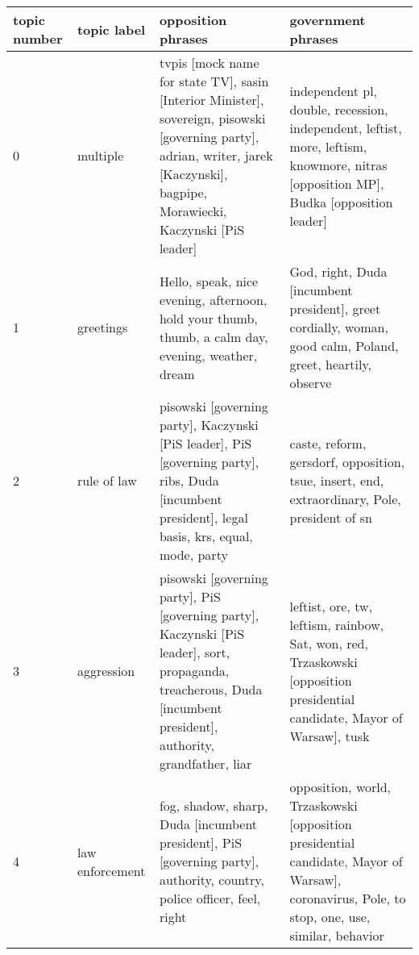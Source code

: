 \begin{tabular}{p{2cm}p{2cm}p{5cm}p{5cm}}
\toprule
topic number &              topic label &                                                                                                                                                                opposition phrases &                                                                                                                                                                               government phrases \\
\midrule
           0 &                 multiple &  tvpis [mock name for state TV], sasin [Interior Minister], sovereign, pisowski [governing party], adrian, writer, jarek [Kaczynski], bagpipe, Morawiecki, Kaczynski [PiS leader] &                                                              independent pl, double, recession, independent, leftist, more, leftism, knowmore, nitras [opposition MP], Budka [opposition leader] \\
           1 &                greetings &                                                                                Hello, speak, nice evening, afternoon, hold your thumb, thumb, a calm day, evening, weather, dream &                                                                                      God, right, Duda [incumbent president], greet cordially, woman, good calm, Poland, greet, heartily, observe \\
           2 &              rule of law &                                 pisowski [governing party], Kaczynski [PiS leader], PiS [governing party], ribs, Duda [incumbent president], legal basis, krs, equal, mode, party &                                                                                                     caste, reform, gersdorf, opposition, tsue, insert, end, extraordinary, Pole, president of sn \\
           3 &               aggression &                pisowski [governing party], PiS [governing party], Kaczynski [PiS leader], sort, propaganda, treacherous, Duda [incumbent president], authority, grandfather, liar &                                                                        leftist, ore, tw, leftism, rainbow, Sat, won, red, Trzaskowski [opposition presidential candidate, Mayor of Warsaw], tusk \\
           4 &          law enforcement &                                                            fog, shadow, sharp, Duda [incumbent president], PiS [governing party], authority, country, police officer, feel, right &                                                     opposition, world, Trzaskowski [opposition presidential candidate, Mayor of Warsaw], coronavirus, Pole, to stop, one, use, similar, behavior \\

\end{tabular}
